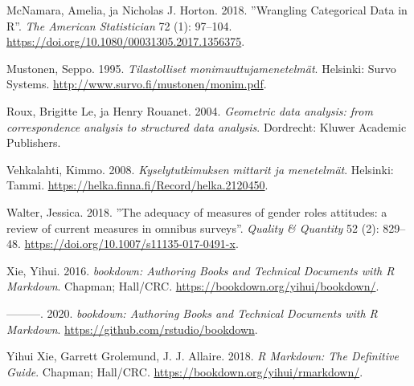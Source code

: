 \documentclass[
  finnish,
]{book}
\begin{document}
\leavevmode\hypertarget{ref-RefWorks:doc:5c3759c2e4b0085b307c82b5}{}%
McNamara, Amelia, ja Nicholas J. Horton. 2018. ''Wrangling Categorical
Data in R''. \emph{The American Statistician} 72 (1): 97--104.
\url{https://doi.org/10.1080/00031305.2017.1356375}.

\leavevmode\hypertarget{ref-RefWorks:doc:5a857a44e4b0ed2d44664d95}{}%
Mustonen, Seppo. 1995. \emph{Tilastolliset monimuuttujamenetelmät}.
Helsinki: Survo Systems. \url{http://www.survo.fi/mustonen/monim.pdf}.

\leavevmode\hypertarget{ref-RefWorks:doc:5a857a43e4b0ed2d44664d75}{}%
Roux, Brigitte Le, ja Henry Rouanet. 2004. \emph{Geometric data
analysis: from correspondence analysis to structured data analysis}.
Dordrecht: Kluwer Academic Publishers.

\leavevmode\hypertarget{ref-RefWorks:doc:5a857a44e4b0ed2d44664da4}{}%
Vehkalahti, Kimmo. 2008. \emph{Kyselytutkimuksen mittarit ja
menetelmät}. Helsinki: Tammi.
\url{https://helka.finna.fi/Record/helka.2120450}.

\leavevmode\hypertarget{ref-RefWorks:doc:5bd08fb6e4b05c5447c9a9f9}{}%
Walter, Jessica. 2018. ''The adequacy of measures of gender roles
attitudes: a review of current measures in omnibus surveys''.
\emph{Quality \& Quantity} 52 (2): 829--48.
\url{https://doi.org/10.1007/s11135-017-0491-x}.

\leavevmode\hypertarget{ref-RefWorks:doc:5b6b36dde4b09b7ec442bf8b}{}%
Xie, Yihui. 2016. \emph{bookdown: Authoring Books and Technical
Documents with R Markdown}. Chapman; Hall/CRC.
\url{https://bookdown.org/yihui/bookdown/}.

\leavevmode\hypertarget{ref-R-bookdown}{}%
---------. 2020. \emph{bookdown: Authoring Books and Technical Documents
with R Markdown}. \url{https://github.com/rstudio/bookdown}.

\leavevmode\hypertarget{ref-RefWorks:doc:5b6b346fe4b0c619b11b8a3e}{}%
Yihui Xie, Garrett Grolemund, J. J. Allaire. 2018. \emph{R Markdown: The
Definitive Guide}. Chapman; Hall/CRC.
\url{https://bookdown.org/yihui/rmarkdown/}.

\backmatter
\end{document}
